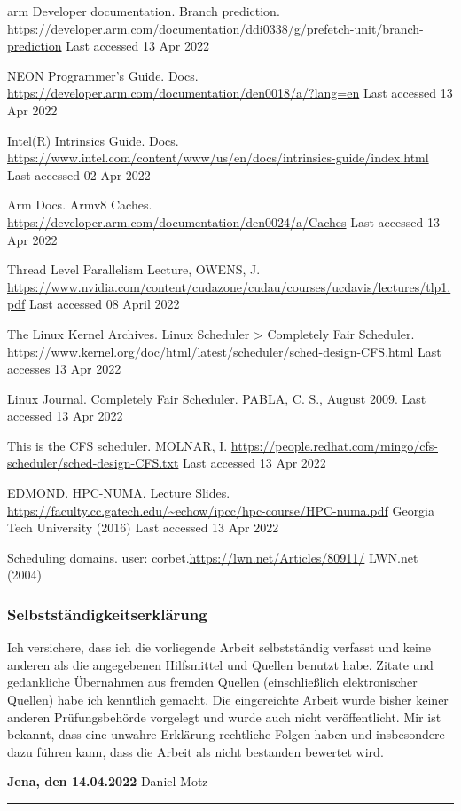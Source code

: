 \documentclass[runningheads]{llncs}
\begin{document}
\begin{thebibliography}{8}
arm Developer documentation. Branch prediction. \url{https://developer.arm.com/documentation/ddi0338/g/prefetch-unit/branch-prediction}
Last accessed 13 Apr 2022

NEON Programmer's Guide. Docs. \url{https://developer.arm.com/documentation/den0018/a/?lang=en}
Last accessed 13 Apr 2022

Intel(R) Intrinsics Guide. Docs. \url{https://www.intel.com/content/www/us/en/docs/intrinsics-guide/index.html}
Last accessed 02 Apr 2022

Arm Docs. Armv8 Caches. \url{https://developer.arm.com/documentation/den0024/a/Caches}
Last accessed 13 Apr 2022

Thread Level Parallelism Lecture, OWENS, J. \url{https://www.nvidia.com/content/cudazone/cudau/courses/ucdavis/lectures/tlp1.pdf}
Last accessed 08 April 2022

The Linux Kernel Archives. Linux Scheduler > Completely Fair Scheduler. \url{https://www.kernel.org/doc/html/latest/scheduler/sched-design-CFS.html}
Last accesses 13 Apr 2022

Linux Journal. Completely Fair Scheduler. PABLA, C. S., August 2009.
Last accessed 13 Apr 2022

This is the CFS scheduler. MOLNAR, I. \url{https://people.redhat.com/mingo/cfs-scheduler/sched-design-CFS.txt}
Last accessed 13 Apr 2022

EDMOND. HPC-NUMA. Lecture Slides. \url{https://faculty.cc.gatech.edu/~echow/ipcc/hpc-course/HPC-numa.pdf}
Georgia Tech University (2016)
Last accessed 13 Apr 2022

Scheduling domains. user: corbet.\url{https://lwn.net/Articles/80911/}
LWN.net (2004)

\end{thebibliography}

\newpage

\subsubsection{Selbstständigkeitserklärung}
\noindent Ich versichere, dass ich die vorliegende Arbeit selbstständig verfasst und keine anderen 
als die angegebenen Hilfsmittel und Quellen benutzt habe. Zitate und gedankliche Übernahmen 
aus fremden Quellen (einschließlich elektronischer Quellen) habe ich kenntlich gemacht. 
Die eingereichte Arbeit wurde bisher keiner anderen Prüfungsbehörde vorgelegt und wurde auch
nicht veröffentlicht. Mir ist bekannt, dass eine unwahre Erklärung rechtliche Folgen haben 
und insbesondere dazu führen kann, dass die Arbeit als nicht bestanden bewertet wird.

\vspace{10mm}

\noindent
\textbf{Jena, den 14.04.2022}
\hfill
Daniel Motz

\par\noindent\rule{\textwidth}{0.4pt}
\end{document}
